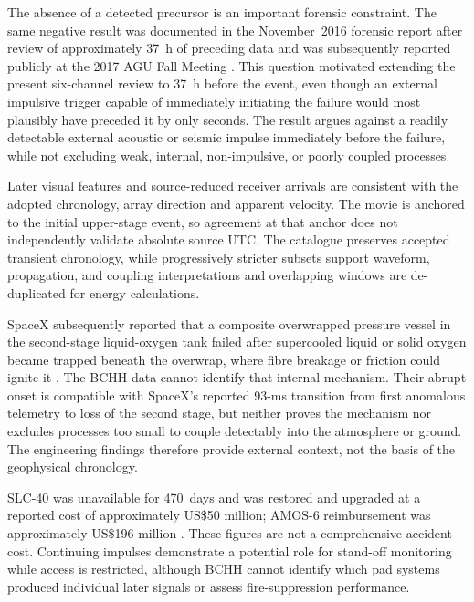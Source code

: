 \documentclass[]{seismica}
\begin{document}
The absence of a detected precursor is an important forensic constraint. The same negative result was documented in the
November~2016 forensic report after review of approximately 37~h of preceding
data \citep{thompson_mcnutt_fireball_2016} and was subsequently reported
publicly at the 2017 AGU Fall Meeting \citep{thompson_agu_falcon9_2017}.
This question motivated extending the present six-channel review to 37~h
before the event, even though an external impulsive
trigger capable of immediately initiating the failure would most plausibly
have preceded it by only seconds. The result argues against
a readily detectable external acoustic or seismic impulse immediately before
the failure, while not excluding weak, internal, non-impulsive, or poorly
coupled processes.

Later visual features and source-reduced receiver arrivals are consistent
with the adopted chronology, array direction and apparent velocity. The
movie is anchored to the initial upper-stage event, so agreement at that
anchor does not independently validate absolute source UTC. The
catalogue preserves accepted transient chronology, while progressively stricter
subsets support waveform, propagation, and coupling interpretations and
overlapping windows are de-duplicated for energy calculations.

SpaceX subsequently reported that a composite overwrapped pressure vessel in
the second-stage liquid-oxygen tank failed after supercooled liquid or solid
oxygen became trapped beneath the overwrap, where fibre breakage or friction
could ignite it \citep{spacex_anomaly_2017,nasa_sma_falcon9}. The BCHH data
cannot identify that internal mechanism. Their abrupt onset is compatible with
SpaceX's reported 93-ms transition from first anomalous telemetry to loss of
the second stage, but neither proves the mechanism nor excludes processes too
small to couple detectably into the atmosphere or ground. The engineering
findings therefore provide external context, not the basis of the geophysical
chronology.

SLC-40 was unavailable for 470~days and was restored and upgraded at a reported
cost of approximately US\$50 million; AMOS-6 reimbursement was approximately
US\$196 million \citep{clark_slc40_2017,magan_amos6_2016,
spacex_crs13_2017}. These figures are not a comprehensive accident cost.
Continuing impulses demonstrate a potential role for stand-off monitoring
while access is restricted, although BCHH cannot identify which pad systems
produced individual later signals or assess fire-suppression performance.
\end{document}
